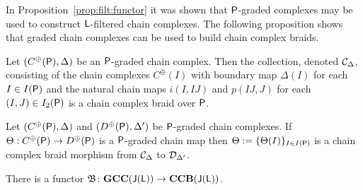 In Proposition~\ref{prop:filt:functor} it was shown that ${\mathsf P}$-graded complexes may be used to construct ${\mathsf L}$-filtered chain complexes.  The following proposition shows that graded chain complexes can be used to build chain complex braids.

\begin{prop}\label{prop:fran:3.4}
Let $(C^\oplus({\mathsf P}),\Delta)$ be an ${\mathsf P}$-graded chain complex.  Then the collection, denoted ${\mathcal C}_\Delta$, consisting of the chain complexes $C^\oplus(I)$ with boundary map $\Delta(I)$ for each $I\in I({\mathsf P})$ and the natural chain maps $i(I,IJ)$ and $p(IJ,J)$ for each $(I,J)\in I_2({\mathsf P})$ is a chain complex braid over ${\mathsf P}$. 
\end{prop}

\begin{prop}\label{prop:UTMap}
Let $(C^\oplus({\mathsf P}),\Delta)$ and $(D^\oplus({\mathsf P}),\Delta')$ be ${\mathsf P}$-graded chain complexes.  If $\Theta:C^\oplus({\mathsf P})\to D^\oplus({\mathsf P})$ is a ${\mathsf P}$-graded chain map then $\Theta:=\{\Theta(I)\}_{I\in I({\mathsf P})}$ is a chain complex braid morphism from ${\mathcal C}_\Delta$ to  $\mathcal{D}_{\Delta'}$.
\end{prop}








\begin{cor}
There is a functor $\mathfrak{B}\colon {\bf GCC}({\mathsf J}({\mathsf L}))\to {\bf CCB}({\mathsf J}({\mathsf L}))$.
\end{cor}

